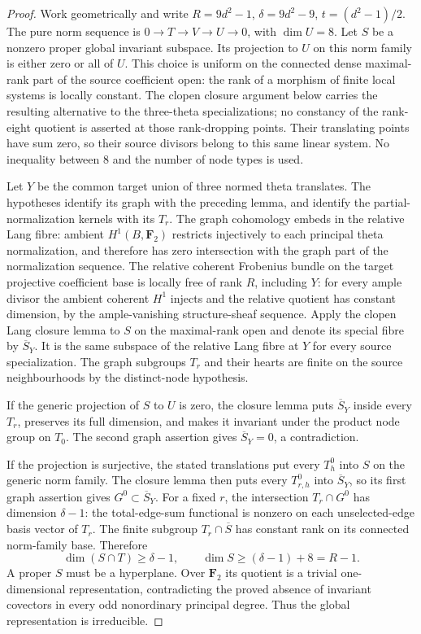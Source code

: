 \begin{proof}
Work geometrically and write $R=9d^2-1$, $\delta=9d^2-9$,
$t=(d^2-1)/2$. The pure norm sequence is
$0\to T\to V\to U\to0$, with $\dim U=8$.
Let $S$ be a nonzero proper global invariant subspace. Its projection
to $U$ on this norm family is either zero or all of $U$.
This choice is uniform on the connected dense maximal-rank part of
the source coefficient open:
the rank of a morphism of finite \etale local systems is locally
constant. The clopen closure argument below carries the resulting
alternative to the three-theta specializations; no constancy of
the rank-eight quotient is asserted at those rank-dropping points.
Their translating points have sum zero, so their source divisors
belong to this same linear system.
No inequality between $8$ and the number of node types is used.

Let $Y$ be the common target union of three normed theta translates.
The hypotheses identify its graph with the preceding lemma, and
identify the partial-normalization kernels with its $T_r$.
The graph cohomology embeds in the relative Lang fibre: ambient
$H^1(B,\mathbf F_2)$ restricts injectively to each principal theta
normalization, and therefore has zero intersection with the graph
part of the normalization sequence.
The relative coherent Frobenius bundle on the target projective
coefficient base is locally free of rank $R$, including $Y$:
for every ample divisor the ambient coherent $H^1$ injects and the
relative quotient has constant dimension, by the ample-vanishing
structure-sheaf sequence. Apply the clopen Lang closure lemma to
$S$ on the maximal-rank open and denote its special fibre by
$\overline S_Y$. It is the same subspace of the relative Lang fibre
at $Y$ for every source specialization. The graph subgroups
$T_r$ and their hearts are finite \etale on the source neighbourhoods
by the distinct-node hypothesis.

If the generic projection of $S$ to $U$ is zero, the closure lemma
puts $\overline S_Y$ inside every $T_r$, preserves its full dimension,
and makes it invariant under the product node group on $T_0$.
The second graph assertion gives $\overline S_Y=0$, a contradiction.

If the projection is surjective, the stated translations put every
$T_h^0$ into $S$ on the generic norm family. The closure lemma then
puts every $T_{r,h}^0$ into $\overline S_Y$, so its first graph
assertion gives $G^0\subset\overline S_Y$.
For a fixed $r$, the intersection $T_r\cap G^0$ has dimension
$\delta-1$: the total-edge-sum functional is nonzero on each
unselected-edge basis vector of $T_r$.
The finite \etale subgroup $T_r\cap\overline S$ has constant rank
on its connected norm-family base. Therefore
\[
            \dim(S\cap T)\ge\delta-1,
        \qquad \dim S\ge(\delta-1)+8=R-1.
\]
A proper $S$ must be a hyperplane. Over $\mathbf F_2$ its quotient
is a trivial one-dimensional representation, contradicting the
proved absence of invariant covectors in every odd nonordinary
principal degree. Thus the global representation is irreducible.


\end{proof}

